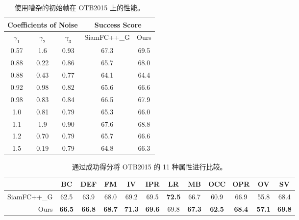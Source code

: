\begin{table}[t]
\renewcommand\arraystretch{0.7}
\centering
\caption{使用嘈杂的初始帧在 OTB2015 上的性能。}
\begin{tabular}{c c c | c c}
\toprule
\multicolumn{3}{c|}{Coefficients of Noise} & \multicolumn{2}{c}{Success Score} \\
\midrule
$\gamma_1$ & $\gamma_2$ & $\gamma_3$  & SiamFC++\_G & Ours  \\
\midrule
0.57  &	1.6	 & 0.93	& 67.3    & 69.5 \\
0.88  & 0.22 & 0.86 & 65.7    & 68.0 \\
0.88  & 0.43 & 0.77 & 64.1    & 64.4 \\
0.92  & 0.98 & 0.82 & 65.6    & 66.6 \\
0.98  & 0.83 & 0.84 & 66.5    & 67.9 \\
1.0   & 0.81 & 0.79 & 65.3    & 66.0 \\
1.1   &	1.9  & 0.90	& 67.6    & 68.8 \\
1.2   & 0.70 & 0.79 & 65.7    & 66.6 \\
1.5   & 0.19 & 0.79 & 64.8    & 66.3 \\
\bottomrule
\end{tabular}
\label{table:noise}
\end{table}

\begin{table}[t]
\renewcommand\arraystretch{0.8}
\centering
\setlength{\tabcolsep}{2pt}
\caption{通过成功得分将 OTB2015 的 11 种属性进行比较。}
\begin{tabular}{r c c c c c c c c c c c}
\toprule
            & BC & DEF & FM            & IV            & IPR           & LR    & MB    & OCC   & OPR   & OV    & SV    \\
\midrule
SiamFC++\_G  &  62.5 & 63.9 & 68.0          & 69.2          & 69.5          & \textbf{72.5}  & 66.7 & 60.9 & 66.9 & 55.8 & 68.4 \\
Ours        & \textbf{66.5} & \textbf{66.8} & \textbf{68.7} & \textbf{71.3} & \textbf{69.6} & 69.8  & \textbf{67.3} & \textbf{62.5} & \textbf{68.4} & \textbf{57.1} & \textbf{69.8} \\
\bottomrule
\end{tabular}
\label{table:attr}
\end{table}

